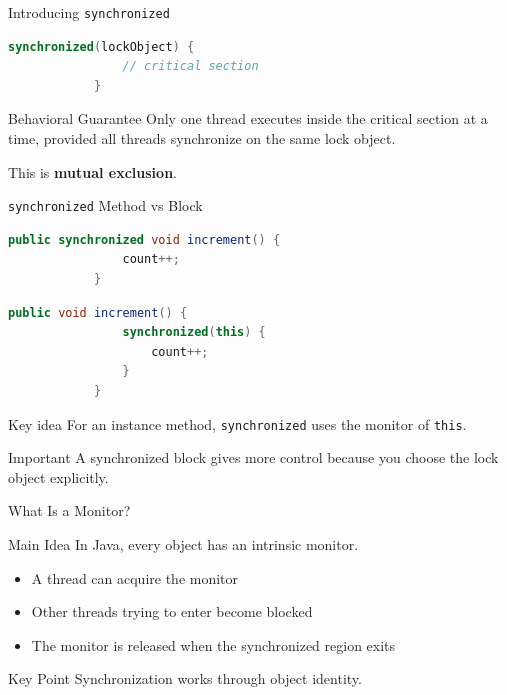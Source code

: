 \documentclass[aspectratio=169,11pt]{beamer}
\begin{document}
	\begin{frame}[fragile]{Introducing \texttt{synchronized}}
		\begin{lstlisting}[language=Java]
			synchronized(lockObject) {
				// critical section
			}
		\end{lstlisting}
		
		\bigskip
		\begin{block}{Behavioral Guarantee}
			Only one thread executes inside the critical section at a time,
			provided all threads synchronize on the same lock object.
		\end{block}
		
		\bigskip
		This is \textbf{mutual exclusion}.
	\end{frame}
	
	\begin{frame}[fragile]{\texttt{synchronized} Method vs Block}
		\begin{lstlisting}[language=Java]
			public synchronized void increment() {
				count++;
			}
		\end{lstlisting}
		
		\vspace{0.2cm}
		
		\begin{lstlisting}[language=Java]
			public void increment() {
				synchronized(this) {
					count++;
				}
			}
		\end{lstlisting}
		
		\vspace{0.3cm}
		\begin{block}{Key idea}
			For an instance method, \texttt{synchronized} uses the monitor of \texttt{this}.
		\end{block}
		
		\begin{alertblock}{Important}
			A synchronized block gives more control because you choose the lock object explicitly.
		\end{alertblock}
	\end{frame}
	
	\begin{frame}{What Is a Monitor?}
		\begin{block}{Main Idea}
			In Java, every object has an intrinsic monitor.
		\end{block}
		
		\begin{itemize}
			\item A thread can acquire the monitor
			\item Other threads trying to enter become blocked
			\item The monitor is released when the synchronized region exits
		\end{itemize}
		
		\bigskip
		\begin{alertblock}{Key Point}
			Synchronization works through object identity.
		\end{alertblock}
	\end{frame}
	
\end{document}
